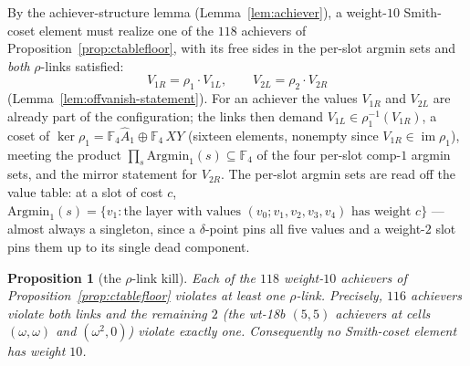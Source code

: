 \documentclass[11pt]{article}
\newcommand{\F}[1]{\mathbb{F}_{#1}}
\DeclareMathOperator{\img}{im}
\newcommand{\hA}{\hat{A}}
\theoremstyle{plain}
\newtheorem{proposition}[lemma]{Proposition}
\theoremstyle{definition}
\theoremstyle{remark}
\begin{document}
By the achiever-structure lemma (Lemma~\ref{lem:achiever}), a weight-$10$ Smith-coset element
must realize one of the $118$ achievers of Proposition~\ref{prop:ctablefloor}, with its free
sides in the per-slot argmin sets and \emph{both} $\rho$-links satisfied:
\[
  V_{1R}=\rho_1\cdot V_{1L},\qquad V_{2L}=\rho_2\cdot V_{2R}
\]
(Lemma~\ref{lem:offvanish-statement}). For an achiever the values $V_{1R}$ and $V_{2L}$ are already part
of the configuration; the links then demand $V_{1L}\in\rho_1^{-1}(V_{1R})$, a coset of
$\ker\rho_1=\F4\hA_1\oplus\F4\,XY$ (sixteen elements, nonempty since $V_{1R}\in\img\rho_1$),
meeting the product $\prod_s\mathrm{Argmin}_1(s)\subseteq\F4$ of the four per-slot comp-$1$
argmin sets, and the mirror statement for $V_{2R}$. The per-slot argmin sets are read off the
value table: at a slot of cost $c$, $\mathrm{Argmin}_1(s)=\{v_1: \text{the layer with values }
(v_0;v_1,v_2,v_3,v_4)\text{ has weight }c\}$ --- almost always a singleton, since a
$\delta$-point pins all five values and a weight-$2$ slot pins them up to its single dead
component.

\begin{proposition}[the $\rho$-link kill]\label{prop:kill}
Each of the $118$ weight-$10$ achievers of Proposition~\ref{prop:ctablefloor} violates at
least one $\rho$-link. Precisely, $116$ achievers violate both links and the remaining $2$
(the wt-18b $(5,5)$ achievers at cells $(\omega,\omega)$ and $(\omega^2,0)$) violate exactly
one. Consequently no Smith-coset element has weight $10$.
\end{proposition}
\end{document}

